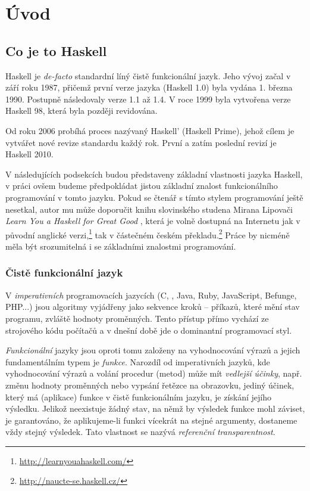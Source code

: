 \chapter{Úvod}

\section{Co je to Haskell}

Haskell je \textit{de-facto} standardní líný čistě funkcionální jazyk. Jeho
vývoj začal v září roku 1987, přičemž první verze jazyka (Haskell 1.0) byla
vydána 1. března 1990. Postupně následovaly verze 1.1 až 1.4. V roce 1999 byla
vytvořena  verze Haskell 98, která
byla později revidována.


Od roku 2006 probíhá proces nazývaný Haskell' (Haskell Prime), jehož cílem je
vytvářet nové revize standardu každý rok. První a zatím poslední revizí je
Haskell 2010.

V následujících podsekcích budou představeny základní vlastnosti jazyka Haskell,
v práci ovšem budeme předpokládat jistou základní znalost funkcionálního
programování v tomto jazyku. Pokud se čtenář s tímto stylem programování ještě
nesetkal, autor mu může doporučit knihu slovinského studena Mirana Lipovači
\emph{Learn You a Haskell for Great Good} \cite{lipovaca2011learn}, která je
volně dostupná na Internetu jak v původní anglické verzi,\footnote{\url{http://learnyouahaskell.com/}} tak v částečném českém
překladu.\footnote{\url{http://naucte-se.haskell.cz/}} Práce by nicméně měla být
srozumitelná i se základními znalostmi 
programování.

\subsection{Čistě funkcionální jazyk}

V \emph{imperativních} programovacích jazycích (C, \Cplusplus{}, Java, Ruby,
JavaScript, Befunge, PHP...) jsou algoritmy vyjádřeny jako sekvence kroků --
příkazů, které mění stav programu, zvláště hodnoty proměnných.  Tento přístup
přímo vychází ze strojového kódu počítačů a v dnešní době jde o dominantní
programovací styl.

\emph{Funkcionální} jazyky jsou oproti tomu založeny na vyhodnocování výrazů a
jejich fundamentálním typem je \emph{funkce}. Narozdíl od imperativních jazyků,
kde vyhodnocování výrazů a volání procedur (metod) může mít \emph{vedlejší
účinky}, např. změnu hodnoty proměnných nebo vypsání řetězce na obrazovku,
jediný účinek, který má  (aplikace) funkce v čistě funkcionálním
jazyku, je získání jejího výsledku. Jelikož neexistuje žádný stav, na němž by
výsledek funkce mohl záviset, je garantováno, že aplikujeme-li funkci vícekrát
na stejné argumenty, dostaneme vždy stejný výsledek. Tato vlastnost se nazývá
\emph{referenční transparentnost}.

